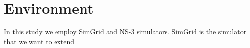 \chapter{Environment}
\label{chapter:environment}
In this study we employ SimGrid and NS-3 simulators. SimGrid is the simulator that we want to extend
